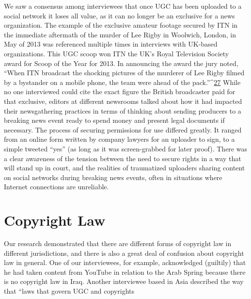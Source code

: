 \begin{enumerate}
We saw a consensus among interviewees that once UGC has been uploaded
to a social network it loses all value, as it can no longer be an exclusive for
a news organization. The example of the exclusive amateur footage secured
by ITN in the immediate aftermath of the murder of Lee Rigby in Woolwich,
London, in May of 2013 was referenced multiple times in interviews
with UK-based organizations. This UGC scoop won ITN the UK's Royal
Television Society award for Scoop of the Year for 2013. In announcing the
award the jury noted, ``When ITN broadcast the shocking pictures of the
murderer of Lee Rigby filmed by a bystander on a mobile phone, the team
were ahead of the pack.''^{\href{#endnotes}{27}} While no one interviewed could cite the exact figure
the British broadcaster paid for that exclusive, editors at different newsrooms
talked about how it had impacted their newsgathering practices in
terms of thinking about sending producers to a breaking news event ready
to spend money and present legal documents if necessary.
The process of securing permissions for use differed greatly. It ranged from
an online form written by company lawyers for an uploader to sign, to a simple
tweeted ``yes'' (as long as it was screen-grabbed for later proof). There
was a clear awareness of the tension between the need to secure rights in a
way that will stand up in court, and the realities of traumatized uploaders
sharing content on social networks during breaking news events, often in
situations where Internet connections are unreliable.
\section{Copyright Law}
Our research demonstrated that there are different forms of copyright law
in different jurisdictions, and there is also a great deal of confusion about
copyright law in general. One of our interviewees, for example, acknowledged
(guiltily) that he had taken content from YouTube in relation to the
Arab Spring because there is no copyright law in Iraq. Another interviewee
based in Asia described the way that ``laws that govern UGC and copyrights


\end{enumerate}
